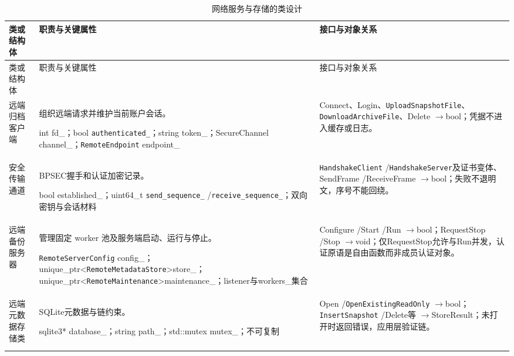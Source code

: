 \begin{longtable}{@{}L{.22\linewidth}L{.34\linewidth}L{.38\linewidth}@{}}
\caption{网络服务与存储的类设计}\label{tab:classes-3}\\
\toprule 类或结构体 & 职责与关键属性 & 接口与对象关系\\\midrule\endfirsthead
\toprule 类或结构体 & 职责与关键属性 & 接口与对象关系\\\midrule\endhead
\bottomrule\endfoot

远端归档客户端\par{} & 组织远端请求并维护当前账户会话。\par int fd\_；bool \nolinkurl{authenticated\_}；string token\_；SecureChannel channel\_；\nolinkurl{RemoteEndpoint} endpoint\_ & Connect、Login、\nolinkurl{UploadSnapshotFile}、\nolinkurl{DownloadArchiveFile}、Delete $\to$\allowbreak bool；凭据不进入缓存或日志。\\\addlinespace[4pt]

安全传输通道\par{} & BPSEC握手和认证加密记录。\par bool established\_；uint64\_t \nolinkurl{send\_sequence\_} /\allowbreak \nolinkurl{receive\_sequence\_}；双向密钥与会话材料 & \nolinkurl{HandshakeClient} /\allowbreak \nolinkurl{HandshakeServer}及证书变体、SendFrame /\allowbreak ReceiveFrame $\to$\allowbreak bool；失败不退明文，序号不能回绕。\\\addlinespace[4pt]

远端备份服务器\par{} & 管理固定 worker 池及服务端启动、运行与停止。\par \nolinkurl{RemoteServerConfig} config\_；unique\_ptr<\allowbreak \nolinkurl{RemoteMetadataStore}>\allowbreak  store\_；unique\_ptr<\allowbreak \nolinkurl{RemoteMaintenance}>\allowbreak  maintenance\_；listener与workers\_集合 & Configure /\allowbreak Start /\allowbreak Run $\to$\allowbreak bool；RequestStop /\allowbreak Stop $\to$\allowbreak void；仅RequestStop允许与Run并发，认证原语是自由函数而非成员认证对象。\\\addlinespace[4pt]

远端元数据存储类\par{} & SQLite元数据与链约束。\par sqlite3* database\_；string path\_；std::mutex mutex\_；不可复制 & Open /\allowbreak \nolinkurl{OpenExistingReadOnly} $\to$\allowbreak bool；\nolinkurl{InsertSnapshot} /\allowbreak Delete等 $\to$\allowbreak StoreResult；未打开时返回错误，应用层验证链。\\\addlinespace[4pt]

\end{longtable}
